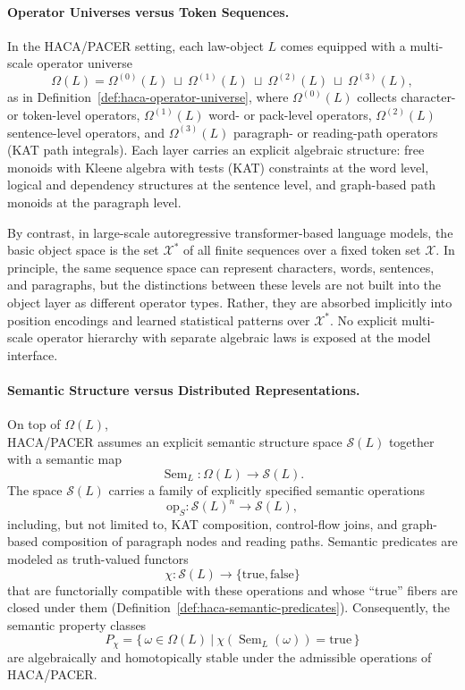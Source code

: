\documentclass[11pt]{book}
\theoremstyle{plain}
\theoremstyle{definition}
\theoremstyle{remark}
\begin{document}
\paragraph{Operator Universes versus Token Sequences.}

In the HACA/PACER setting, each law-object $L$ comes equipped with a
multi-scale operator universe
\[
  \Omega(L)
  =
  \Omega^{(0)}(L)\ \sqcup\ \Omega^{(1)}(L)\ \sqcup\ \Omega^{(2)}(L)\ \sqcup\ \Omega^{(3)}(L),
\]
as in Definition~\ref{def:haca-operator-universe}, where
$\Omega^{(0)}(L)$ collects character- or token-level operators,
$\Omega^{(1)}(L)$ word- or pack-level operators, $\Omega^{(2)}(L)
$ sentence-level operators, and $\Omega^{(3)}(L)$ paragraph- or
reading-path operators (KAT path integrals). Each layer carries an
explicit algebraic structure: free monoids with Kleene algebra with
tests (KAT) constraints at the word level, logical and dependency
structures at the sentence level, and graph-based path monoids at the
paragraph level.

By contrast, in large-scale autoregressive transformer-based language
models, the basic object space is the set $\mathcal{X}^\ast$ of all
finite sequences over a fixed token set $\mathcal{X}$. In principle, the
same sequence space can represent characters, words, sentences, and
paragraphs, but the distinctions between these levels are not built into
the object layer as different operator types. Rather, they are absorbed
implicitly into position encodings and learned statistical patterns over
$\mathcal{X}^\ast$. No explicit multi-scale operator hierarchy with
separate algebraic laws is exposed at the model interface.



\paragraph{Semantic Structure versus Distributed Representations.}

On top of $\Omega(L)$, \\HACA/PACER assumes an explicit semantic structure
space $\mathcal{S}(L)$ together with a semantic map
\[
  \operatorname{Sem}_L:\Omega(L)\longrightarrow \mathcal{S}(L).
\]
The space $\mathcal{S}(L)$ carries a family of explicitly specified
semantic operations
\[
  \mathrm{op}_S : \mathcal{S}(L)^n \longrightarrow \mathcal{S}(L),
\]
including, but not limited to, KAT composition, control-flow joins, and
graph-based composition of paragraph nodes and reading paths. Semantic
predicates are modeled as truth-valued functors
\[
  \chi:\mathcal{S}(L)\to\{\mathrm{true},\mathrm{false}\}
\]
that are functorially compatible with these operations and whose
``true'' fibers are closed under them
(Definition~\ref{def:haca-semantic-predicates}). Consequently, the
semantic property classes
\[
  P_\chi
  =
  \bigl\{\, \omega\in\Omega(L)\ \big|\ \chi(\operatorname{Sem}_L(\omega))
  = \mathrm{true} \,\bigr\}
\]
are algebraically and homotopically stable under the admissible
operations of HACA/PACER.
\end{document}
